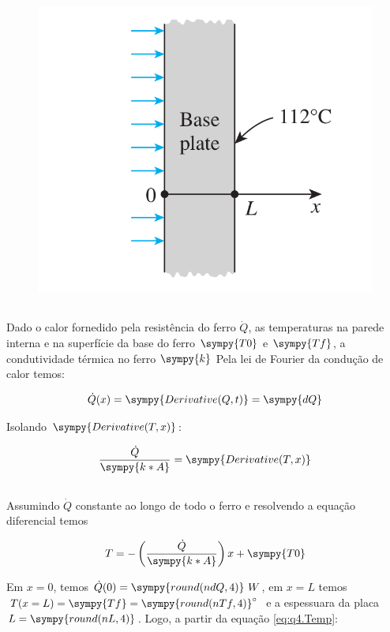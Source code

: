 \documentclass[a4paper,11pt]{article}
\newcommand{\npy}[1]{\sympy{round(n#1,4)}}
\begin{document}
\begin{figure}[H]
\centering
\includegraphics[width = 0.6\linewidth]{./image/lista1/q4}
\end{figure}

\subsection{}

Dado o calor fornedido pela resistência do ferro $\dot{Q}$, as temperaturas na parede interna e na superfície da base do ferro $\sympy{T0}$ e $\sympy{Tf}$, a condutividade térmica no ferro $\sympy{k}$ Pela lei de Fourier da condução de calor temos:

\begin{equation}\label{eq:fourierlaw-cond}
\dot{Q}(x) = \sympy{Derivative(Q,t)} = \sympy{dQ}
\end{equation}

Isolando $\sympy{Derivative(T,x)}$:

$$\frac{\dot{Q}}{\sympy{k*A}} = \sympy{Derivative(T,x)}$$

\subsection{}

Assumindo $\dot{Q}$ constante ao longo de todo o ferro e resolvendo a equação diferencial temos

\begin{equation}\label{eq:q4.Temp}
T = -\left(\frac{\dot{Q}}{\sympy{k*A}}\right)x + \sympy{T0}
\end{equation}

Em $x = 0$, temos $\dot{Q}(0) = \npy{dQ}\ W$, em $x=L$ temos $T(x=L) = \sympy{Tf} = \npy{Tf}^\circ $ e a espessuara da placa $L=\npy{L}$. Logo, a partir da equação \ref{eq:q4.Temp}:
\end{document}
